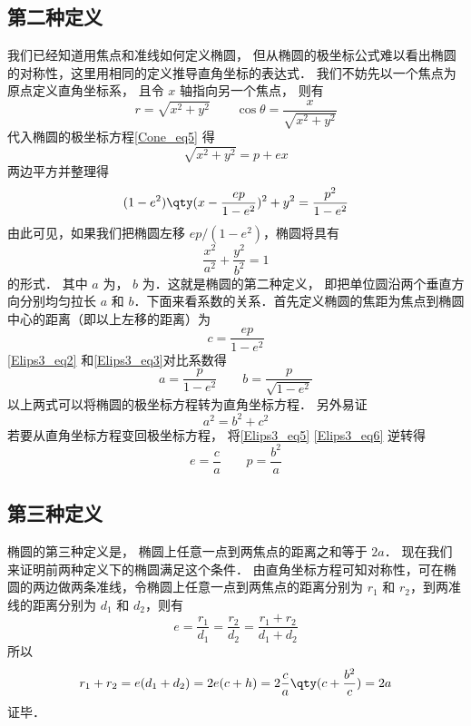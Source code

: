 

\subsection{第二种定义}
我们已经知道用焦点和准线如何定义椭圆， 但从椭圆的极坐标公式难以看出椭圆的对称性，这里用相同的定义推导直角坐标的表达式． 我们不妨先以一个焦点为原点定义直角坐标系， 且令 $x$ 轴指向另一个焦点， 则有
\begin{equation}
r = \sqrt{x^2 + y^2} \qquad \cos\theta = \frac{x}{\sqrt{x^2 + y^2}}
\end{equation}
代入椭圆的极坐标方程\autoref{Cone_eq5} 得
\begin{equation}
\sqrt{x^2 + y^2} = p + ex
\end{equation}
两边平方并整理得
\begin{equation}\label{Elips3_eq2}
(1 - e^2) \qty( x - \frac{ep}{1 - e^2} )^2 + y^2 = \frac{p^2}{1 - e^2}
\end{equation}
由此可见，如果我们把椭圆左移 $ep/(1 - e^2)$，椭圆将具有
\begin{equation}\label{Elips3_eq3}
\frac{x^2}{a^2} + \frac{y^2}{b^2} = 1
\end{equation}
的形式． 其中 $a$ 为， $b$ 为．这就是椭圆的第二种定义， 即把单位圆沿两个垂直方向分别均匀拉长 $a$ 和 $b$．下面来看系数的关系．首先定义椭圆的焦距为焦点到椭圆中心的距离（即以上左移的距离）为
\begin{equation}\label{Elips3_eq5}
c = \frac{ep}{1 - e^2}
\end{equation}
\autoref{Elips3_eq2} 和\autoref{Elips3_eq3}对比系数得
\begin{equation}\label{Elips3_eq6}
a = \frac{p}{1 - e^2} \qquad b = \frac{p}{\sqrt {1 - e^2} }
\end{equation}
以上两式可以将椭圆的极坐标方程转为直角坐标方程． 另外易证
\begin{equation}\label{Elips3_eq7}
a^2 = b^2 + c^2
\end{equation}
若要从直角坐标方程变回极坐标方程， 将\autoref{Elips3_eq5} \autoref{Elips3_eq6} 逆转得
\begin{equation}\label{Elips_eq8}
e = \frac{c}{a}\qquad
p = \frac{b^2}{a}
\end{equation}

\subsection{第三种定义}
椭圆的第三种定义是， 椭圆上任意一点到两焦点的距离之和等于 $2a$． 现在我们来证明前两种定义下的椭圆满足这个条件． 由直角坐标方程可知对称性，可在椭圆的两边做两条准线，令椭圆上任意一点到两焦点的距离分别为 $r_1$ 和 $r_2$，到两准线的距离分别为 $d_1$ 和 $d_2$，则有
\begin{equation}
e = \frac{r_1}{d_1} = \frac{r_2}{d_2} = \frac{r_1 + r_2}{d_1 + d_2}
\end{equation}
所以
\begin{equation}\label{Elips3_eq9}
r_1 + r_2 = e(d_1+d_2) = 2e(c + h) = 2\frac{c}{a} \qty( c + \frac{b^2}{c} ) = 2a
\end{equation}
证毕．
